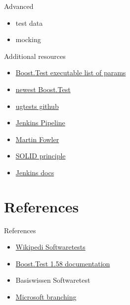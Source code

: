 \documentclass{beamer}
\begin{document}
    \begin{frame}{Advanced}
        \begin{itemize}
            \item test data%
            \item mocking
        \end{itemize}
    \end{frame}
    
    \begin{frame}{Additional resources}
            \begin{itemize}
                \item \href{https://www.boost.org/doc/libs/1_58_0/libs/test/doc/html/utf/user-guide/runtime-config/reference.html}{Boost.Test executable list of params}
                \item \href{https://www.boost.org/doc/libs/1_73_0/libs/test/}{newest Boost.Test} %
                \item \href{https://github.com/UG4/plugin_UGTest}{ugtests github}
                \item \href{https://www.jenkins.io/doc/book/pipeline/syntax/}{Jenkins Pipeline}
                \item \href{https://martinfowler.com/articles/practical-test-pyramid.html}{Martin Fowler}
                \item \href{https://en.wikipedia.org/wiki/SOLID}{SOLID principle}
                \item \href{https://www.jenkins.io/doc/}{Jenkins docs}
            \end{itemize}
    \end{frame}

    \section{References}
    \begin{frame}{References}
        \begin{itemize}
            \item \href{https://en.wikipedia.org/wiki/Software_testing}{Wikipedi Softwaretests}
            \item \href{https://www.boost.org/doc/libs/1_58_0/libs/test/}{Boost.Test 1.58 documentation}
            \item Basiswissen Softwaretest
            \item \href{https://docs.microsoft.com/en-us/azure/devops/repos/git/git-branching-guidance?view=azure-devops}{Microsoft branching}
        \end{itemize}
    \end{frame}
\end{document}
